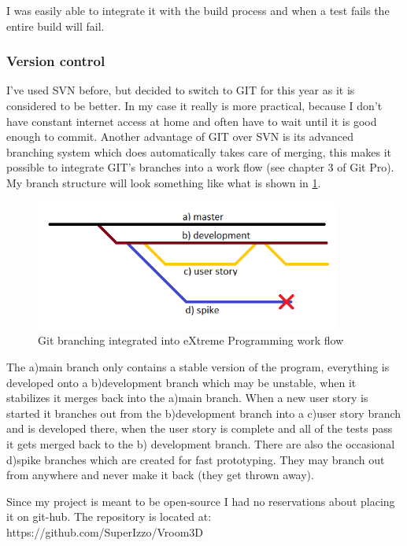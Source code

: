 \documentclass[11pt,fleqn,twoside]{article}
\begin{document}
I was easily able to integrate it with the build process and when a test fails the entire build will fail.

\subsubsection{Version control}
I've used SVN before, but decided to switch to GIT for this year as it is considered to be better. In my case it really is more practical, because I don't have constant internet access at home and often have to wait until it is good enough to commit. Another advantage of GIT over SVN is its advanced branching system which does automatically takes care of merging, this makes it possible to integrate GIT's branches into a work flow (see chapter 3 of Git Pro\cite{ProGit}). My branch structure will look something like what is shown in \ref{fig:gitXPbranches}.

\begin{figure}[h]
\centering
\includegraphics[width=0.9\textwidth]{git-XP-branches}
\caption{Git branching integrated into eXtreme Programming work flow}
\label{fig:gitXPbranches}
\end{figure}

The a)main branch  only contains a stable version of the program, everything is developed onto a b)development branch which may be unstable, when it stabilizes it merges back into the a)main branch. When a new user story is started it branches out from the b)development branch into a c)user story branch and is developed there, when the user story is complete and all of the tests pass it gets merged back to the b) development branch. There are also the occasional d)spike branches which are created for fast prototyping. They may branch out from anywhere and never make it back (they get thrown away).

Since my project is meant to be open-source I had no reservations about placing it on git-hub. The repository is located at: https://github.com/SuperIzzo/Vroom3D
\end{document}
